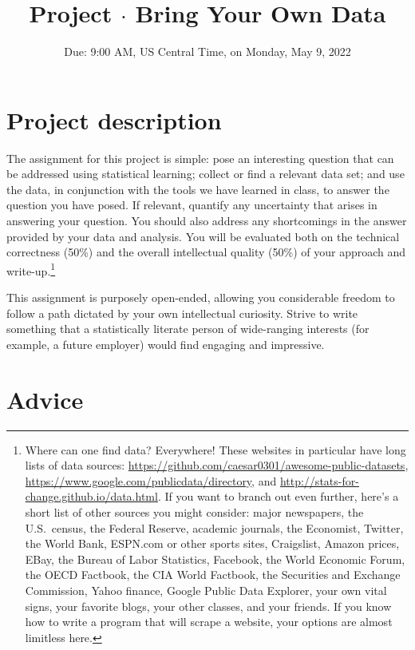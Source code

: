 \documentclass{mynotes}
\title[Project $\cdot$ ECO 395M]{Project $\cdot$ Bring Your Own Data}
\date{Due: 9:00 AM, US Central Time, on Monday, May 9, 2022}  %
\begin{document}
\maketitle%


\section{Project description}

The assignment for this project is simple: pose an interesting question that can be addressed using statistical learning; collect or find a relevant data set; and use the data, in conjunction with the tools we have learned in class, to answer the question you have posed.  If relevant, quantify any uncertainty that arises in answering your question.  You should also address any shortcomings in the answer provided by your data and analysis.   You will be evaluated both on the technical correctness (50\%) and the overall intellectual quality (50\%) of your approach and write-up.\footnote{Where can one find data?  Everywhere!  These websites in particular have long lists of data sources: \url{https://github.com/caesar0301/awesome-public-datasets}, \url{https://www.google.com/publicdata/directory}, and  \url{http://stats-for-change.github.io/data.html}.   If you want to branch out even further, here's a short list of other sources you might consider: major newspapers, the U.S.~census, the Federal Reserve, academic journals, the Economist, Twitter, the World Bank, ESPN.com or other sports sites, Craigslist, Amazon prices, EBay, the Bureau of Labor Statistics, Facebook, the World Economic Forum, the OECD Factbook, the CIA World Factbook, the Securities and Exchange Commission, Yahoo finance, Google Public Data Explorer,  your own vital signs, your favorite blogs, your other classes, and your friends.  If you know how to write a program that will scrape a website, your options are almost limitless here. }

This assignment is purposely open-ended, allowing you considerable freedom to follow a path dictated by your own intellectual curiosity.  Strive to write something that a statistically literate person of wide-ranging interests (for example, a future employer) would find engaging and impressive.

\section{Advice}
\end{document}
